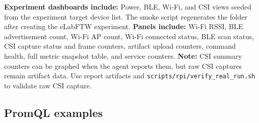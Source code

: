\documentclass[11pt,a4paper]{article}
\begin{document}
\textbf{Experiment dashboards include:} Power, BLE, Wi-Fi, and CSI views seeded from the
experiment target device list. The smoke script regenerates the folder after creating the eLabFTW
experiment.
\textbf{Panels include:} Wi-Fi RSSI, BLE advertisement count, Wi-Fi AP count, Wi-Fi connected status,
BLE scan status, CSI capture status and frame counters, artifact upload counters, command health,
full metric snapshot table, and service counters.
\textbf{Note:} CSI summary counters can be graphed when the agent reports them, but raw CSI captures remain artifact data.
Use report artifacts and \texttt{scripts/rpi/verify\_real\_run.sh} to validate raw CSI capture.

\subsection{PromQL examples}
\end{document}

